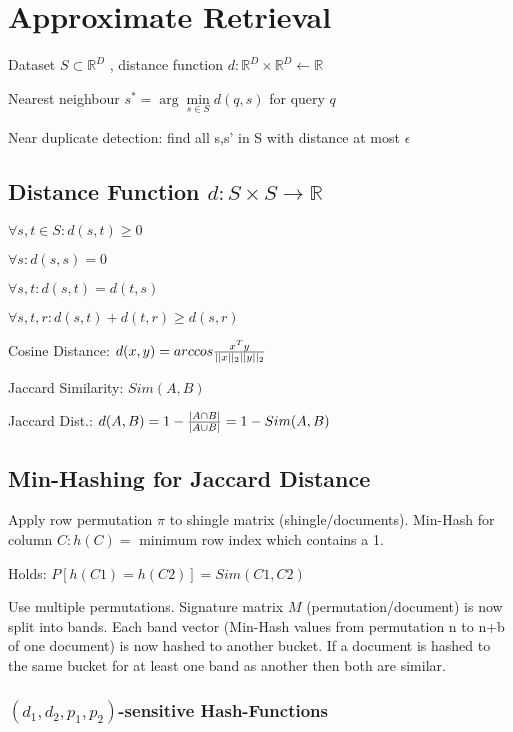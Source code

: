 \documentclass[a4paper,11pt,twocolumn]{article}
\author{Matthias Ganz, geaendert von Philipp Rohr}
\begin{document}
\section{Approximate Retrieval}
Dataset $S \subset \mathbb{R}^D$ , distance function $d: \mathbb{R}^D \times \mathbb{R}^D \leftarrow \mathbb{R}$

Nearest neighbour $s^* = \arg\min \limits_{s \in S} d(q,s) $ for query $q$

Near duplicate detection: find all s,s' in S with distance at most $\epsilon$

\subsection{Distance Function $d: S \times S  \rightarrow \mathbb{R}$}

$\forall s,t \in S : d(s,t) \geq 0$

$\forall s: d(s,s) = 0$

$\forall s,t:d(s,t) = d(t,s)$

$\forall s,t,r : d(s,t) + d(t,r) \geq d(s,r)$

Cosine Distance: $d(x,y) = arccos  {{x^T y}\over{ ||x||_2 ||y||_2}} $

Jaccard Similarity: $Sim(A,B)$

Jaccard Dist.: $d(A,B) = 1 - {{|A \cap B|}\over{|A \cup B|}} = 1 - Sim(A,B) $


\subsection{Min-Hashing for Jaccard Distance}
Apply row permutation $\pi$ to shingle matrix (shingle/documents). Min-Hash for column $C: h(C) =$ minimum row index which contains a 1.

Holds: $P[h(C1) = h(C2)] = Sim (C1,C2)$

Use multiple permutations. Signature matrix $M$ (permutation/document) is now split into bands. Each band vector (Min-Hash values from permutation n to n+b of one document) is now hashed to another bucket. If a document is hashed to the same bucket for at least one band as another then both are similar.


\subsubsection{$(d_1,d_2,p_1,p_2)$-sensitive Hash-Functions}
\end{document}
